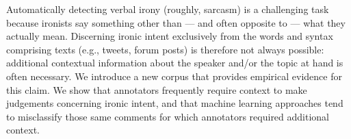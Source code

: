 Automatically detecting verbal irony (roughly, sarcasm) is a challenging task because ironists say something other than --- and often opposite to --- what they actually mean. Discerning ironic intent exclusively from the words and syntax comprising texts (e.g., tweets, forum posts) is therefore not always possible: additional contextual information about the speaker and/or the topic at hand is often necessary. We introduce a new corpus that provides empirical evidence for this claim. We show that annotators frequently require context to make judgements concerning ironic intent, and that machine learning approaches tend to misclassify those same comments for which annotators required additional context.
